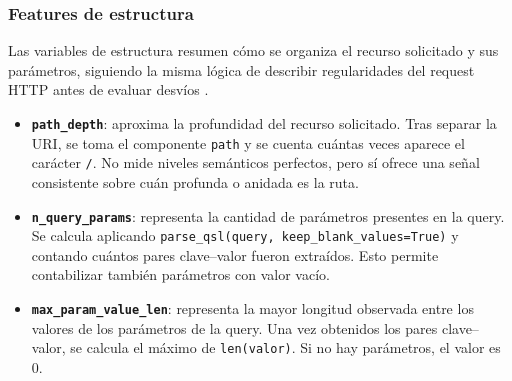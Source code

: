 \documentclass[12pt,oneside]{report}
\begin{document}
\subsubsection{Features de estructura}
Las variables de estructura resumen cómo se organiza el recurso solicitado y sus parámetros, siguiendo la misma lógica de describir regularidades del request HTTP antes de evaluar desvíos \cite{kruegel_vigna_2003,ingham_inoue_2007}.
\begin{itemize}[leftmargin=*]
  \item \textbf{\texttt{path\_depth}}: aproxima la profundidad del recurso solicitado. Tras separar la URI, se toma el componente \texttt{path} y se cuenta cuántas veces aparece el carácter \texttt{/}. No mide niveles semánticos perfectos, pero sí ofrece una señal consistente sobre cuán profunda o anidada es la ruta.

  \item \textbf{\texttt{n\_query\_params}}: representa la cantidad de parámetros presentes en la query. Se calcula aplicando \texttt{parse\_qsl(query, keep\_blank\_values=True)} y contando cuántos pares clave--valor fueron extraídos. Esto permite contabilizar también parámetros con valor vacío.

  \item \textbf{\texttt{max\_param\_value\_len}}: representa la mayor longitud observada entre los valores de los parámetros de la query. Una vez obtenidos los pares clave--valor, se calcula el máximo de \texttt{len(valor)}. Si no hay parámetros, el valor es 0.
\end{itemize}
\end{document}
